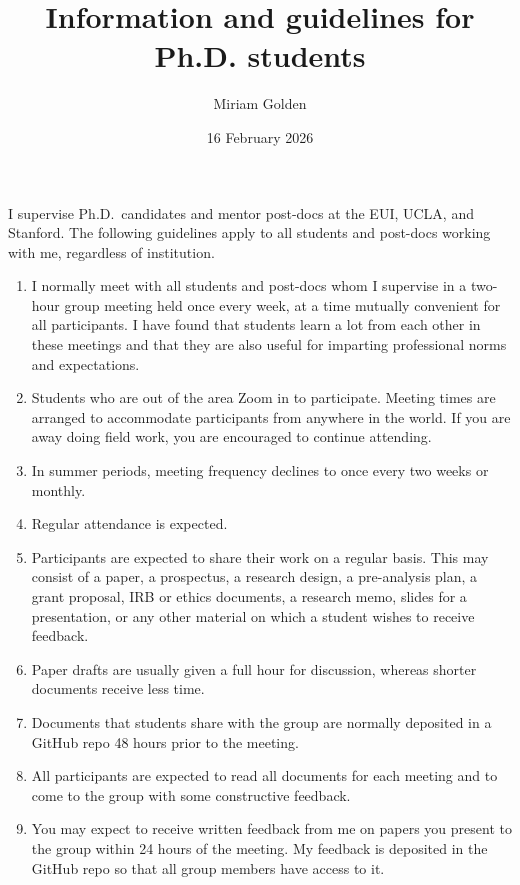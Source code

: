 \documentclass[12pt]{article}
\title{Information and guidelines for Ph.D. students}
\author{Miriam Golden}
\date{16 February 2026}
\begin{document}
\maketitle

\noindent I supervise Ph.D.\ candidates and mentor post-docs at the EUI, UCLA, and Stanford. The following guidelines apply to all students and post-docs working with me, regardless of institution.

\begin{enumerate}

\item I normally meet with all students and post-docs whom I supervise in a two-hour group meeting held once every week, at a time mutually convenient for all participants. I have found that students learn a lot from each other in these meetings and that they are also useful for imparting professional norms and expectations.

\item Students who are out of the area Zoom in to participate. Meeting times are arranged to accommodate participants from anywhere in the world. If you are away doing field work, you are encouraged to continue attending.

\item In summer periods, meeting frequency declines to once every two weeks or monthly.

\item Regular attendance is expected.

\item Participants are expected to share their work on a regular basis. This may consist of a paper, a prospectus, a research design, a pre-analysis plan, a grant proposal, IRB or ethics documents, a research memo, slides for a presentation, or any other material on which a student wishes to receive feedback.

\item Paper drafts are usually given a full hour for discussion, whereas shorter documents receive less time.

\item Documents that students share with the group are normally deposited in a GitHub repo 48 hours prior to the meeting.

\item All participants are expected to read all documents for each meeting and to come to the group with some constructive feedback.

\item You may expect to receive written feedback from me on papers you present to the group within 24 hours of the meeting. My feedback is deposited in the GitHub repo so that all group members have access to it.


\end{enumerate}
\end{document}

